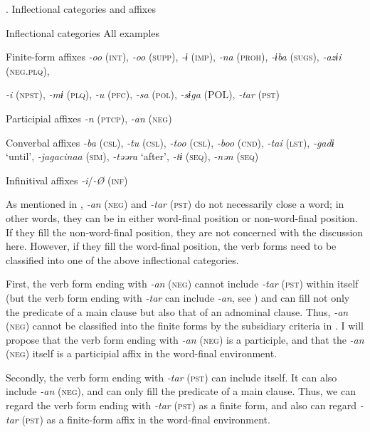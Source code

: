 \begin{table}
\caption{\label{tab:key:79}. Inflectional categories and affixes}

Inflectional categories  All examples

Finite-form affixes  \textit{-oo} (\textsc{int}), \textit{-oo} (\textsc{supp}), \textit{-ɨ} (\textsc{imp}), \textit{-na} (\textsc{proh}), \textit{-ɨba} (\textsc{sugs}), \textit{-azɨi} (\textsc{neg}.\textsc{plq}),

\textit{-i} (\textsc{npst}), \textit{-mɨ} (\textsc{plq}), \textit{-u} (\textsc{pfc}), \textit{-sa} (\textsc{pol}), \textit{-sɨga} (POL), \textit{-tar} (\textsc{pst})

Participial affixes  \textit{-n} (\textsc{ptcp}), \textit{-an} (\textsc{neg})

Converbal affixes  \textit{-ba} (\textsc{csl}), \textit{-tu} (\textsc{csl}), \textit{-too} (\textsc{csl}), \textit{-boo} (\textsc{cnd}), \textit{-tai} (\textsc{lst}), \textit{-gadɨ} ‘until’, \textit{-jagacinaa} (\textsc{sim}), \textit{-təəra} ‘after’, \textit{-tɨ} (\textsc{seq}), \textit{-nən} (\textsc{seq})

Infinitival affixes  \textit{-i}/\textit{-Ø} (\textsc{inf})
\end{table}

As mentioned in , \textit{-an} (\textsc{neg}) and \textit{-tar} (\textsc{pst}) do not necessarily close a word; in other words, they can be in either word-final position or non-word-final position. If they fill the non-word-final position, they are not concerned with the discussion here. However, if they fill the word-final position, the verb forms need to be classified into one of the above inflectional categories.

First, the verb form ending with \textit{-an} (\textsc{neg}) cannot include \textit{-tar} (\textsc{pst}) within itself (but the verb form ending with \textit{-tar} can include \textit{-an}, see ) and can fill not only the predicate of a main clause but also that of an adnominal clause. Thus, \textit{-an} (\textsc{neg}) cannot be classified into the finite forms by the subsidiary criteria in . I will propose that the verb form ending with \textit{-an} (\textsc{neg}) is a participle, and that the \textit{-an} (\textsc{neg}) itself is a participial affix in the word-final environment.

Secondly, the verb form ending with \textit{-tar} (\textsc{pst}) can include itself. It can also include \textit{-an} (\textsc{neg}), and can only fill the predicate of a main clause. Thus, we can regard the verb form ending with \textit{-tar} (\textsc{pst}) as a finite form, and also can regard \textit{-tar} (\textsc{pst}) as a finite-form affix in the word-final environment.

